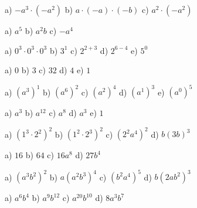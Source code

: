 \begin{tehtavasivu}
    \begin{tehtava}
        a) $-a^3\cdot(-a^2)$ \qquad
        b) $a\cdot(-a)\cdot(-b)$ \qquad
        c) $a^2\cdot(-a^2)$
        
        \begin{vastaus}
            a) $a^5$ \qquad
            b) $a^2b$ \qquad
            c) $-a^4$
        \end{vastaus}
    \end{tehtava}

    \begin{tehtava}
        a) $0^3\cdot0^3\cdot0^3$ \qquad
        b) $3^1$ \qquad
        c) $2^{2+3}$ \qquad
        d) $2^{6-4}$ \qquad
        e) $5^0$

        \begin{vastaus}
            a) $0$ \qquad
            b) $3$ \qquad
            c) $32$ \qquad
            d) $4$ \qquad
            e) $1$
        \end{vastaus}
    \end{tehtava}
    \begin{tehtava}
        a) $(a^3)^1$ \qquad
        b) $(a^6)^2$ \qquad
        c) $(a^2)^4$ \qquad 
        d) $(a^1)^3$ \qquad
        e) $(a^0)^5$

        \begin{vastaus}
            a) $a^3$ \qquad
            b) $a^{12}$ \qquad
            c) $a^8$ \qquad
            d) $a^3$ \qquad
            e) $1$
        \end{vastaus}
    \end{tehtava}
    
       \begin{tehtava}
        a) $(1^3\cdot 2^2)^2$ \qquad
        b) $(1^2\cdot 2^3)^2$ \qquad
        c) $(2^2a^4)^2$ \qquad
        d) $b(3b)^3$

        \begin{vastaus}
            a) $16$ \qquad
            b) $64$ \qquad
            c) $16a^8$ \qquad
            d) $27b^4$
        \end{vastaus}
    \end{tehtava}
    
    \begin{tehtava}
        a) $(a^3b^2)^2$ \qquad
        b) $a(a^2b^3)^4$ \qquad
        c) $(b^2a^4)^5$ \qquad
        d) $b(2ab^2)^3$
        
        \begin{vastaus}
            a) $a^6b^4$ \qquad
            b) $a^9b^{12}$ \qquad
            c) $a^{20}b^{10}$ \qquad
            d) $8a^3b^7$
        \end{vastaus}
    \end{tehtava}
      

\end{tehtavasivu}
